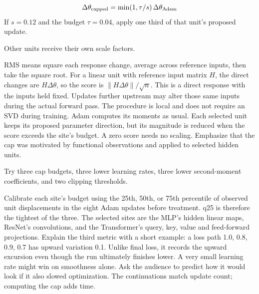 {
\[
       \Delta\theta_{\rm capped}
       =\min(1,\tau/s)\,\Delta\theta_{\rm Adam}
\]
\quad If \(s=0.12\) and the budget \(\tau=0.04\), apply one third of that unit's proposed update.
\par\small Other units receive their own scale factors.}
{RMS means square each response change, average across reference inputs, then take the square root. For a linear unit with reference input matrix \(H\), the direct changes are \(H\Delta\theta\), so the score is \(\|H\Delta\theta\|/\sqrt n\). This is a direct response with the inputs held fixed. Updates further upstream may alter those same inputs during the actual forward pass. The procedure is local and does not require an SVD during training. Adam computes its moments as usual. Each selected unit keeps its proposed parameter direction, but its magnitude is reduced when the score exceeds the site's budget. A zero score needs no scaling. Emphasize that the cap was motivated by functional observations and applied to selected hidden units.}

{
{\par Try three cap budgets, three lower learning rates, three lower second-moment coefficients, and two clipping thresholds.}
\vspace{5mm}}
{Calibrate each site's budget using the 25th, 50th, or 75th percentile of observed unit displacements in the eight Adam updates before treatment. q25 is therefore the tightest of the three. The selected sites are the MLP's hidden linear maps, ResNet's convolutions, and the Transformer's query, key, value and feed-forward projections. Explain the third metric with a short example: a loss path 1.0, 0.8, 0.9, 0.7 has upward variation 0.1. Unlike final loss, it records the upward excursion even though the run ultimately finishes lower. A very small learning rate might win on smoothness alone. Ask the audience to predict how it would look if it also slowed optimization. The continuations match update count; computing the cap adds time.}

